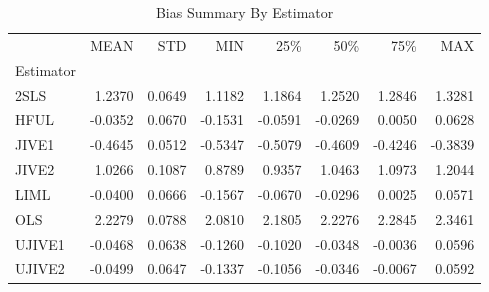 \begin{table}[ht]
\centering
\caption{Bias Summary By Estimator}
\begin{tabular}{lrrrrrrr}
\toprule
 & MEAN & STD & MIN & 25\% & 50\% & 75\% & MAX \\
Estimator &  &  &  &  &  &  &  \\
\midrule
2SLS & 1.2370 & 0.0649 & 1.1182 & 1.1864 & 1.2520 & 1.2846 & 1.3281 \\
HFUL & -0.0352 & 0.0670 & -0.1531 & -0.0591 & -0.0269 & 0.0050 & 0.0628 \\
JIVE1 & -0.4645 & 0.0512 & -0.5347 & -0.5079 & -0.4609 & -0.4246 & -0.3839 \\
JIVE2 & 1.0266 & 0.1087 & 0.8789 & 0.9357 & 1.0463 & 1.0973 & 1.2044 \\
LIML & -0.0400 & 0.0666 & -0.1567 & -0.0670 & -0.0296 & 0.0025 & 0.0571 \\
OLS & 2.2279 & 0.0788 & 2.0810 & 2.1805 & 2.2276 & 2.2845 & 2.3461 \\
UJIVE1 & -0.0468 & 0.0638 & -0.1260 & -0.1020 & -0.0348 & -0.0036 & 0.0596 \\
UJIVE2 & -0.0499 & 0.0647 & -0.1337 & -0.1056 & -0.0346 & -0.0067 & 0.0592 \\
\bottomrule
\end{tabular}
\end{table}
